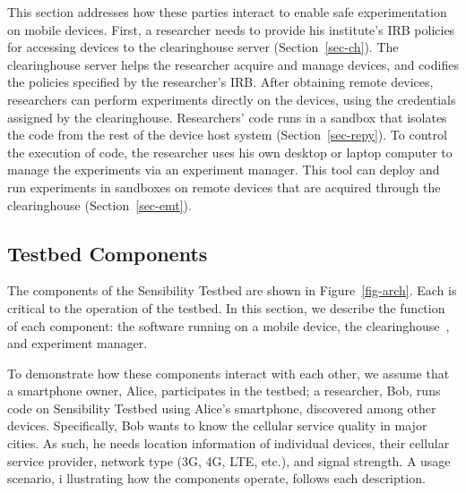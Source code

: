 This section addresses how these parties interact to
enable safe experimentation on mobile devices. First, 
a researcher needs to provide his institute's 
IRB policies for accessing devices to the clearinghouse 
server (Section~\ref{sec-ch}).  
The clearinghouse server helps the researcher acquire and manage
devices, and codifies the policies specified by the
researcher's IRB. 
After obtaining remote devices, researchers can perform
experiments directly on the devices, using the credentials assigned by
the clearinghouse. Researchers' code runs in a sandbox 
that isolates the code from the rest of the device
host system (Section~\ref{sec-repy}). To control the execution of 
code, the researcher uses his own desktop or laptop computer to manage the 
experiments via an experiment manager. This tool can deploy 
and run experiments in sandboxes on remote devices that are 
acquired through the clearinghouse (Section~\ref{sec-emt}).



\subsection{Testbed Components}\label{sec-component}

The components of the Sensibility Testbed are shown in Figure~\ref{fig-arch}.
Each is critical to the operation of the testbed. 
In this section, we describe the function of each component: the
software running on a mobile device, the clearinghouse~\cite{ch}, 
and experiment manager.

To demonstrate how these components interact with each other, we assume 
that a smartphone owner, Alice, participates in the testbed; a researcher, Bob, 
runs code on Sensibility Testbed using Alice's smartphone, discovered among other
devices. Specifically, Bob wants to know the cellular service
quality in major cities. As such, he needs location information
of individual devices, their cellular service provider, network
type (3G, 4G, LTE, etc.), and signal strength. A usage scenario, i
llustrating how the components operate, follows each description.

